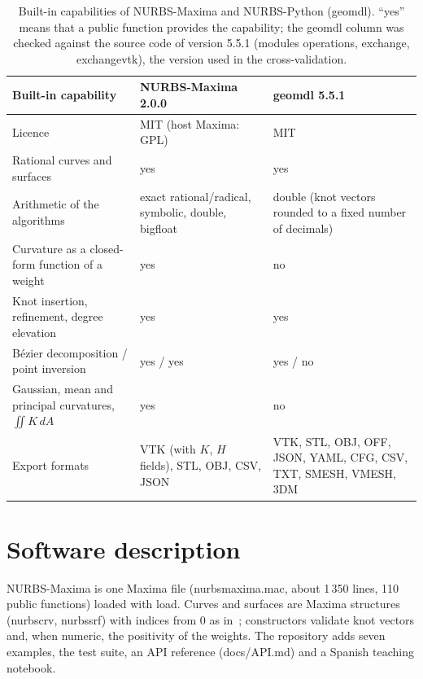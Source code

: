 \documentclass[preprint,12pt]{elsarticle}
\newcommand{\pkg}{NURBS-Maxima}
\newcommand{\code}[1]{{\ttfamily\def\_{\textunderscore\allowbreak}#1}}
\begin{document}
\begin{table}[t]
\centering
\small
\begin{tabularx}{\linewidth}{@{}>{\raggedright\arraybackslash}X>{\raggedright\arraybackslash}p{3.9cm}>{\raggedright\arraybackslash}p{4.3cm}@{}}
\toprule
Built-in capability & \pkg{} 2.0.0 & geomdl 5.5.1~\cite{Bingol2019} \\
\midrule
Licence & MIT (host Maxima: GPL) & MIT \\
Rational curves and surfaces & yes & yes \\
Arithmetic of the algorithms & exact rational/radical, symbolic, double, bigfloat & double (knot vectors rounded to a fixed number of decimals) \\
Curvature as a closed-form function of a weight & yes & no \\
Knot insertion, refinement, degree elevation & yes & yes \\
Bézier decomposition / point inversion & yes / yes & yes / no \\
Gaussian, mean and principal curvatures, $\iint K\,dA$ & yes & no \\
Export formats & VTK (with $K$, $H$ fields), STL, OBJ, CSV, JSON & VTK, STL, OBJ, OFF, JSON, YAML, CFG, CSV, TXT, SMESH, VMESH, 3DM \\
\bottomrule
\end{tabularx}
\caption{Built-in capabilities of \pkg{} and NURBS-Python (geomdl). ``yes'' means that a public function provides the capability; the geomdl column was checked against the source code of version 5.5.1 (modules \code{operations}, \code{exchange}, \code{exchange\_vtk}), the version used in the cross-validation.}
\label{tab:comparison}
\end{table}

\section{Software description}
\label{sec:description}

\pkg{} is one Maxima file (\code{nurbs\_maxima.mac}, about 1\,350 lines, 110 public functions) loaded with \code{load}. Curves and surfaces are Maxima structures (\code{nurbscrv}, \code{nurbssrf}) with indices from 0 as in~\cite{PieglTiller1997}; constructors validate knot vectors and, when numeric, the positivity of the weights. The repository adds seven examples, the test suite, an API reference (\code{docs/API.md}) and a Spanish teaching notebook.
\end{document}
